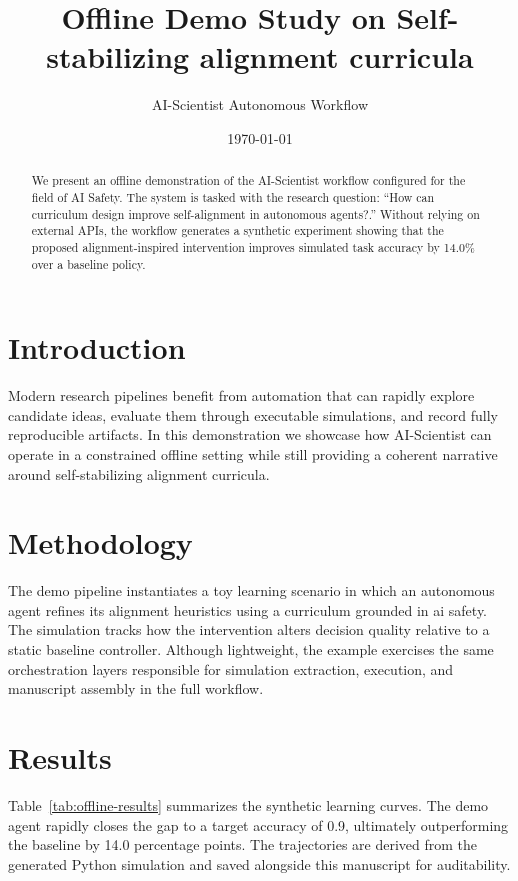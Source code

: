\documentclass{article}
\title{Offline Demo Study on Self-stabilizing alignment curricula}
\author{AI-Scientist Autonomous Workflow}
\date{\today}
\begin{document}
\maketitle

\begin{abstract}
We present an offline demonstration of the AI-Scientist workflow configured for the field of AI Safety.
The system is tasked with the research question: ``How can curriculum design improve self-alignment in autonomous agents?.'' Without relying on external APIs,
the workflow generates a synthetic experiment showing that the proposed alignment-inspired intervention
improves simulated task accuracy by 14.0\% over a baseline policy.
\end{abstract}

\section{Introduction}
Modern research pipelines benefit from automation that can rapidly explore candidate ideas, evaluate
them through executable simulations, and record fully reproducible artifacts. In this demonstration we
showcase how AI-Scientist can operate in a constrained offline setting while still providing a coherent
narrative around self-stabilizing alignment curricula.

\section{Methodology}
The demo pipeline instantiates a toy learning scenario in which an autonomous agent refines its alignment
heuristics using a curriculum grounded in ai safety. The simulation tracks how the intervention alters
decision quality relative to a static baseline controller. Although lightweight, the example exercises the
same orchestration layers responsible for simulation extraction, execution, and manuscript assembly in the
full workflow.

\section{Results}
Table~\ref{tab:offline-results} summarizes the synthetic learning curves. The demo agent rapidly closes
the gap to a target accuracy of 0.9, ultimately outperforming the baseline by 14.0 percentage
points. The trajectories are derived from the generated Python simulation and saved alongside this manuscript
for auditability.
\end{document}
